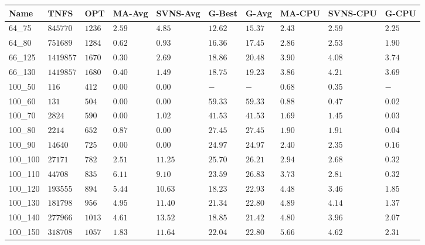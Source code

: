\begin{center}
\begin{table}[]
\centering
\begin{tabular}{|lll|l|l|ll|lll|}
\hline
Name     & TNFS        & OPT    & MA-Avg & SVNS-Avg & G-Best & G-Avg & MA-CPU  & SVNS-CPU & G-CPU \\
\hline
64\_75   & $845770   $ & $1236$ & $2.59$ & $4.85 $  & $12.62$    & $15.37$   & $2.43 $ & $2.59 $  & $2.25$ \\
64\_80   & $751689   $ & $1284$ & $0.62$ & $0.93 $  & $16.36$    & $17.45$   & $2.86 $ & $2.53 $  & $1.90$ \\
\hline
66\_125  & $1419857  $ & $1670$ & $0.30$ & $2.69 $  & $18.86$    & $20.48$   & $3.90 $ & $4.08 $  & $3.74$ \\
66\_130  & $1419857  $ & $1680$ & $0.40$ & $1.49 $  & $18.75$    & $19.23$   & $3.86 $ & $4.21 $  & $3.69$ \\
\hline
100\_50  & $116      $ & $412 $ & $\bm{0.00}$ & $\bm{0.00} $  & $-    $    & $-    $   & $0.68 $ & $0.35 $  & $-   $ \\
100\_60  & $131      $ & $504 $ & $\bm{0.00}$ & $\bm{0.00} $  & $59.33$    & $59.33$   & $0.88 $ & $0.47 $  & $0.02$ \\
100\_70  & $2824     $ & $590 $ & $\bm{0.00}$ & $1.02 $  & $41.53$    & $41.53$   & $1.69 $ & $1.45 $  & $0.03$ \\
100\_80  & $2214     $ & $652 $ & $0.87$ & $\bm{0.00} $  & $27.45$    & $27.45$   & $1.90 $ & $1.91 $  & $0.04$ \\
100\_90  & $14640    $ & $725 $ & $\bm{0.00}$ & $\bm{0.00} $  & $24.97$    & $24.97$   & $2.40 $ & $2.35 $  & $0.16$ \\
100\_100 & $27171    $ & $782 $ & $2.51$ & $11.25$  & $25.70$    & $26.21$   & $2.94 $ & $2.68 $  & $0.32$ \\
100\_110 & $44708    $ & $835 $ & $6.11$ & $9.10 $  & $23.59$    & $26.83$   & $3.73 $ & $2.81 $  & $0.32$ \\
100\_120 & $193555   $ & $894 $ & $5.44$ & $10.63$  & $18.23$    & $22.93$   & $4.48 $ & $3.46 $  & $1.85$ \\
100\_130 & $181798   $ & $956 $ & $4.95$ & $11.40$  & $21.34$    & $22.80$   & $4.89 $ & $4.14 $  & $1.37$ \\
100\_140 & $277966   $ & $1013$ & $4.61$ & $13.52$  & $18.85$    & $21.42$   & $4.80 $ & $3.96 $  & $2.07$ \\
100\_150 & $318708   $ & $1057$ & $1.83$ & $11.64$  & $22.04$    & $22.80$   & $5.66 $ & $4.62 $  & $2.31$ \\

\end{tabular}
\end{table}
\end{center}
